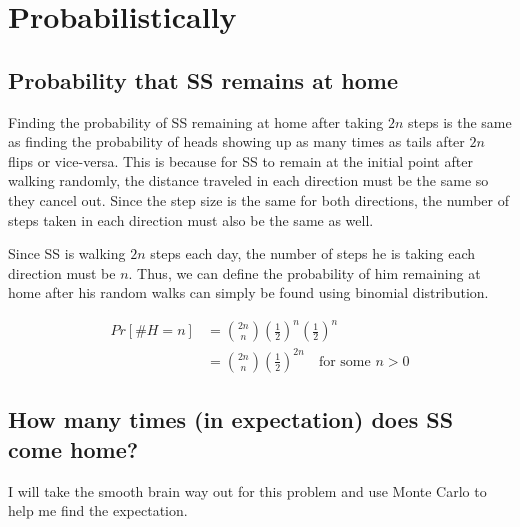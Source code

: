 \chapter{Probabilistically}

\section{Probability that SS remains at home}

Finding the probability of SS remaining at home after taking $2n$ steps is the same as finding the probability of heads showing up as many times as tails after $2n$ flips or vice-versa. This is because for SS to remain at the initial point after walking randomly, the distance traveled in each direction must be the same so they cancel out. Since the step size is the same for both directions, the number of steps taken in each direction must also be the same as well.

Since SS is walking $2n$ steps each day, the number of steps he is taking each direction must be $n$. Thus, we can define the probability of him remaining at home after his random walks can simply be found using binomial distribution.

\begin{equation}
\begin{aligned}
	Pr[\#H = n]
		&=\binom{2n}{n}\left(\frac{1}{2}\right)^n\left(\frac{1}{2}\right)^n \\
		&=\binom{2n}{n}\left(\frac{1}{2}\right)^{2n}\quad\text{for some $n > 0$}
\end{aligned}
\end{equation}

\section{How many times (in expectation) does SS come home?}

I will take the smooth brain way out for this problem and use Monte Carlo to help me find the expectation.
